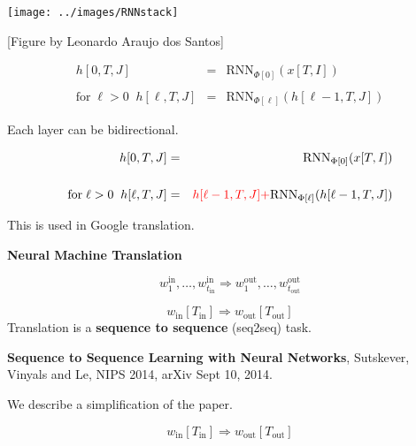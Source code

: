 {

\centerline{\texttt{[image: ../images/RNNstack]}}
\centerline{\large [Figure by Leonardo Araujo dos Santos]}

\begin{eqnarray*}
h[0,T,J] & = & \mathrm{RNN}_{\Phi[0]}(x[T,I]) \\
\\
\mbox{for} \;\ell > 0\;\;h[\ell,T,J] & = & \mathrm{RNN}_{\Phi[\ell]}(h[\ell-1,T,J])
\end{eqnarray*}

Each layer can be bidirectional.



\begin{eqnarray*}
h[0,T,J] & = & \mathrm{RNN}_{\Phi[0]}(x[T,I]) \\
\\
\mbox{for} \;\ell > 0\;\;h[\ell,T,J] & = & {\color{red} h[\ell-1,T,J] +} \mathrm{RNN}_{\Phi[\ell]}(h[\ell-1,T,J])
\end{eqnarray*}

\vfill
This is used in Google translation.

\slide{}

\centerline{\bf Neural Machine Translation}



$$w^{\mathrm{in}}_1,\ldots,w^{\mathrm{in}}_{t_{\mathrm{in}}} \Rightarrow w^{\mathrm{out}}_1,\ldots,w^{\mathrm{out}}_{t_{\mathrm{out}}}$$

$$w_{\mathrm{in}}[T_{\mathrm{in}}] \Rightarrow w_{\mathrm{out}}[T_{\mathrm{out}}]$$
\vfill
Translation is a {\bf sequence to sequence} (seq2seq) task.

\vfill
{\bf Sequence to Sequence Learning with Neural Networks}, Sutskever, Vinyals and Le, NIPS 2014, arXiv Sept 10, 2014.

\vfill
We describe a simplification of the paper.




$$w_{\mathrm{in}}[T_{\mathrm{in}}] \Rightarrow w_{\mathrm{out}}[T_{\mathrm{out}}]$$

}
